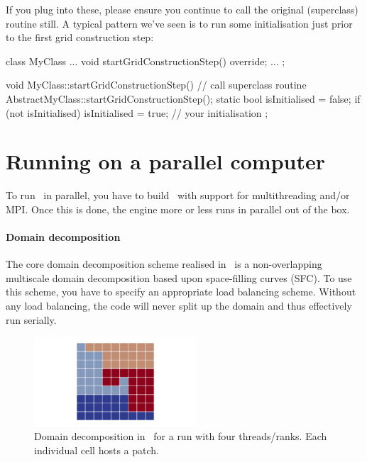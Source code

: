 \noindent
If you plug into these, please ensure you continue to call the original
(superclass) routine still.
A typical pattern we've seen is to run some initialisation just prior to the
first grid construction step:

\begin{code}
class MyClass ... {
  void startGridConstructionStep() override;
  ...
};
\end{code}



\begin{code}
void MyClass::startGridConstructionStep() {
  // call superclass routine
  AbstractMyClass::startGridConstructionStep();
  static bool isInitialised = false;
  if (not isInitialised) {
    isInitialised = true;
    // your initialisation
  }
};
\end{code}

\section{Running on a parallel computer}

To run \ExaHyPE\ in parallel, you have to build \Peano\ with support for
multithreading and/or MPI.
Once this is done, the engine more or less runs in parallel out of the box.


\paragraph{Domain decomposition}
The core domain decomposition scheme realised in \ExaHyPE\ is a non-overlapping
multiscale domain decomposition based upon space-filling curves (SFC).
To use this scheme, you have to specify an appropriate load balancing scheme.
Without any load balancing, the code will never split up the domain and thus
effectively run serially.

\begin{figure}
 \begin{center}
  \includegraphics[width=0.54\textwidth]{60_exahype/domain-decomposition.png}
 \end{center}
 \caption{
  Domain decomposition in \ExaHyPE\ for a run with four threads/ranks. Each
  individual cell hosts a patch.
 }
\end{figure}


